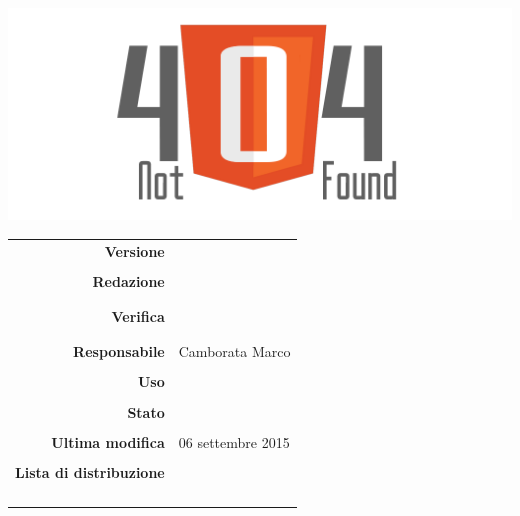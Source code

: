 \thispagestyle{empty}

\begin{titlepage}

	\begin{center}
	\begin{Huge}
		\textbf{\gruppo} \\
	\end{Huge}
	\vspace{0.5cm}
	\begin{Large}
		\textbf{\capitolato}
	\end{Large}
	
	\vspace{1cm}

	\includegraphics[scale=0.35]{../logo/logo404_Extends.png}
	\vspace{1cm}
	\begin{Huge}
		\textbf{\titDoc}
	\end{Huge}
	
	\vspace{1cm}
	
	\begin{table}[h]
	\begin{center}
	\begin{tabular}{r | l}
		\textbf{Versione} & \versione \\ \\
		\textbf{Redazione}
			& \MaMo \\ 
			& \GoIs \\ \\
		\textbf{Verifica} & \ReAn \\ 
			& \VeFe\\  \\
		\textbf{Responsabile} & Camborata Marco\\ \\
		\textbf{Uso} & \uso \\ \\
		\textbf{Stato} & \stato \\ \\
		\textbf{Ultima modifica} & 06 settembre 2015 \\ \\
		\textbf{Lista di distribuzione} & \gruppo \\
			& \Vardanega \\
			& \Cardin \\
			& \Zucchetti \\ \\
	\end{tabular}
	\end{center}
	\end{table}
	\end{center}
\end{titlepage}